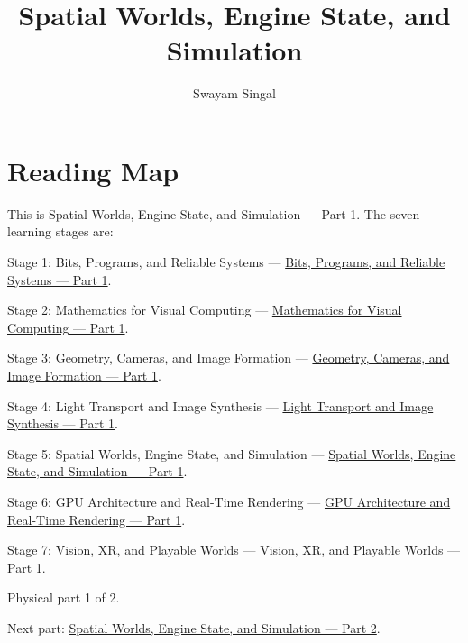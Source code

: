 \documentclass[11pt,twoside,openany]{book}
\title{Spatial Worlds, Engine State, and Simulation}
\author{Swayam Singal}
\begin{document}
\maketitle
\begin{center}\end{center}
\chapter*{Reading Map}
\hypertarget{volume-reading-map}{}
\noindent This is Spatial Worlds, Engine State, and Simulation --- Part 1. The seven learning stages are:
\par\noindent Stage 1: Bits, Programs, and Reliable Systems --- \href{../01-Bits-Programs-and-Reliable-Systems-P01/main.pdf}{Bits, Programs, and Reliable Systems — Part 1}.
\par\noindent Stage 2: Mathematics for Visual Computing --- \href{../02-Mathematics-for-Visual-Computing-P01/main.pdf}{Mathematics for Visual Computing — Part 1}.
\par\noindent Stage 3: Geometry, Cameras, and Image Formation --- \href{../03-Geometry-Cameras-and-Image-Formation-P01/main.pdf}{Geometry, Cameras, and Image Formation — Part 1}.
\par\noindent Stage 4: Light Transport and Image Synthesis --- \href{../04-Light-Transport-and-Image-Synthesis-P01/main.pdf}{Light Transport and Image Synthesis — Part 1}.
\par\noindent Stage 5: Spatial Worlds, Engine State, and Simulation --- \href{../05-Spatial-Worlds-Engine-State-and-Simulation-P01/main.pdf}{Spatial Worlds, Engine State, and Simulation — Part 1}.
\par\noindent Stage 6: GPU Architecture and Real-Time Rendering --- \href{../06-GPU-Architecture-and-Real-Time-Rendering-P01/main.pdf}{GPU Architecture and Real-Time Rendering — Part 1}.
\par\noindent Stage 7: Vision, XR, and Playable Worlds --- \href{../07-Vision-XR-and-Playable-Worlds-P01/main.pdf}{Vision, XR, and Playable Worlds — Part 1}.
\par\noindent Physical part 1 of 2.
\par\noindent Next part: \href{../05-Spatial-Worlds-Engine-State-and-Simulation-P02/main.pdf}{Spatial Worlds, Engine State, and Simulation — Part 2}.
\tableofcontents
\mainmatter
\setcounter{chapter}{0}

\end{document}
